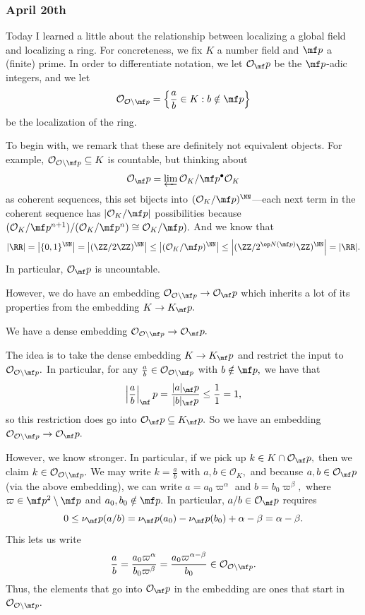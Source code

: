 \subsubsection{April 20th}
Today I learned a little about the relationship between localizing a global field and localizing a ring. For concreteness, we fix $K$ a number field and $\mf p$ a (finite) prime. In order to differentiate notation, we let $\mathcal O_\mf p$ be the $\mf p$-adic integers, and we let
\[\mathcal O_{\mathcal O\setminus\mf p}=\left\{\frac ab\in K:b\notin\mf p\right\}\]
be the localization of the ring.

To begin with, we remark that these are definitely not equivalent objects. For example, $\mathcal O_{\mathcal O\setminus\mf p}\subseteq K$ is countable, but thinking about
\[\mathcal O_\mf p=\varprojlim\mathcal O_K/\mf p^\bullet\mathcal O_K\]
as coherent sequences, this set bijects into $(\mathcal O_K/\mf p)^\NN$---each next term in the coherent sequence has $|\mathcal O_K/\mf p|$ possibilities because $(\mathcal O_K/\mf p^{n+1})/(\mathcal O_K/\mf p^n)\cong\mathcal O_K/\mf p).$ And we know that
\[|\RR|=\left|\{0,1\}^\NN\right|=\left|(\ZZ/2\ZZ)^\NN\right|\le\left|(\mathcal O_K/\mf p)^\NN\right|\le\left|(\ZZ/2^{\op N(\mf p)}\ZZ)^\NN\right|=|\RR|.\]
In particular, $\mathcal O_\mf p$ is uncountable.

However, we do have an embedding $\mathcal O_{\mathcal O\setminus\mf p}\to\mathcal O_\mf p$ which inherits a lot of its properties from the embedding $K\to K_\mf p.$
\begin{proposition}
    We have a dense embedding $\mathcal O_{\mathcal O\setminus\mf p}\to\mathcal O_\mf p.$
\end{proposition}
The idea is to take the dense embedding $K\to K_\mf p$ and restrict the input to $\mathcal O_{\mathcal O\setminus\mf p}.$ In particular, for any $\frac ab\in\mathcal O_{\mathcal O\setminus\mf p}$ with $b\notin\mf p,$ we have that
\[\left|\frac ab\right|_\mf p=\frac{|a|_\mf p}{|b|_\mf p}\le\frac11=1,\]
so this restriction does go into $\mathcal O_\mf p\subseteq K_\mf p.$ So we have an embedding $\mathcal O_{\mathcal O\setminus\mf p}\to\mathcal O_\mf p.$

However, we know stronger. In particular, if we pick up $k\in K\cap\mathcal O_\mf p,$ then we claim $k\in\mathcal O_{\mathcal O\setminus\mf p}.$ We may write $k=\frac ab$ with $a,b\in\mathcal O_K,$ and because $a,b\in\mathcal O_\mf p$ (via the above embedding), we can write $a=a_0\varpi^\alpha$ and $b=b_0\varpi^\beta,$ where $\varpi\in\mf p^2\setminus\mf p$ and $a_0,b_0\notin\mf p.$ In particular, $a/b\in\mathcal O_\mf p$ requires
\[0\le\nu_\mf p(a/b)=\nu_\mf p(a_0)-\nu_\mf p(b_0)+\alpha-\beta=\alpha-\beta.\]
This lets us write
\[\frac ab=\frac{a_0\varpi^\alpha}{b_0\varpi^\beta}=\frac{a_0\varpi^{\alpha-\beta}}{b_0}\in\mathcal O_{\mathcal O\setminus\mf p}.\]
Thus, the elements that go into $\mathcal O_\mf p$ in the embedding are ones that start in $\mathcal O_{\mathcal O\setminus\mf p}.$

